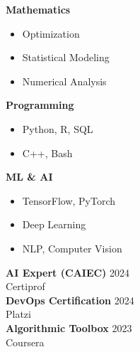 \documentclass[a4paper,10pt]{article}
\begin{document}
\hfill
\begin{minipage}[t]{0.34\textwidth}
    \begin{tcolorbox}[title={\textbf{\textcolor{primary}{Technical Skills}}}, fonttitle=\normalsize]
        \textbf{Mathematics}
        \small
        \begin{itemize}
            \item Optimization
            \item Statistical Modeling
            \item Numerical Analysis
        \end{itemize}
        
        \textbf{Programming}
        \small
        \begin{itemize}
            \item Python, R, SQL
            \item C++, Bash
        \end{itemize}
        
        \textbf{ML \& AI}
        \small
        \begin{itemize}
            \item TensorFlow, PyTorch
            \item Deep Learning
            \item NLP, Computer Vision
        \end{itemize}
    \end{tcolorbox}
    
    \vspace{0.25cm} %
    
    \begin{tcolorbox}[title={\textbf{\textcolor{primary}{Certifications}}}, fonttitle=\normalsize]
        \small
        \textbf{AI Expert (CAIEC)} \hfill 2024\\
        Certiprof\\[0.3em]
        
        \textbf{DevOps Certification} \hfill 2024\\
        Platzi\\[0.3em]
        
        \textbf{Algorithmic Toolbox} \hfill 2023\\
        Coursera
    \end{tcolorbox}
    
    \vspace{0.25cm} %
    

\end{minipage}
\end{document}
